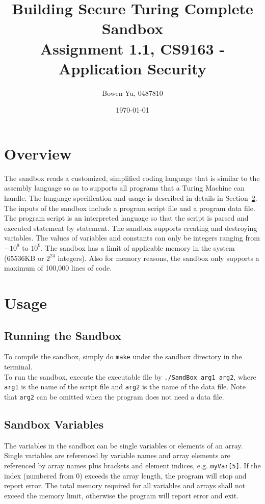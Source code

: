 \documentclass[11pt]{article}
\title{\bf Building Secure Turing Complete Sandbox\\[2ex] 
       \rm\Large Assignment 1.1, CS9163 - Application Security}
\author{Bowen Yu, 0487810}
\date{\today}
\begin{document}
\maketitle
\large

\section{Overview}
The sandbox reads a customized, simplified coding language that is similar to the assembly language so as to supports all programs that a Turing Machine can handle. The language specification and usage is described in details in Section~\ref{sec:usage}. The inputs of the sandbox include a program script file and a program data file. The program script is an interpreted language so that the script is parsed and executed statement by statement. The sandbox supports creating and destroying variables. The values of variables and constants can only be integers ranging from $-10^{9}$ to $10^{9}$. The sandbox has a limit of applicable memory in the system (65536KB or $2^{24}$ integers). Also for memory reasons, the sandbox only supports a maximum of 100,000 lines of code.

\section{Usage}
\label{sec:usage}
\subsection{Running the Sandbox}
To compile the sandbox, simply do {\tt make} under the sandbox directory in the terminal.\\
To run the sandbox, execute the executable file by {\tt ./SandBox arg1 arg2}, where {\tt arg1} is the name of the script file and {\tt arg2} is the name of the data file. Note that {\tt arg2} can be omitted when the program does not need a data file.\\

\subsection{Sandbox Variables}
The variables in the sandbox can be single variables or elements of an array. Single variables are referenced by variable names and array elements are referenced by array names plus brackets and element indices, e.g. {\tt myVar[5]}. If the index (numbered from 0) exceeds the array length, the program will stop and report error. The total memory required for all variables and arrays shall not exceed the memory limit, otherwise the program will report error and exit.
\end{document}
